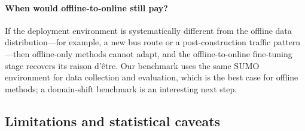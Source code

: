 \documentclass[journal,10pt]{IEEEtran}
\begin{document}
\paragraph{When would offline-to-online still pay?} If the deployment environment is systematically different from the offline data distribution---for example, a new bus route or a post-construction traffic pattern---then offline-only methods cannot adapt, and the offline-to-online fine-tuning stage recovers its raison d'\^etre. Our benchmark uses the same SUMO environment for data collection and evaluation, which is the best case for offline methods; a domain-shift benchmark is an interesting next step.

\subsection{Limitations and statistical caveats}
\end{document}
